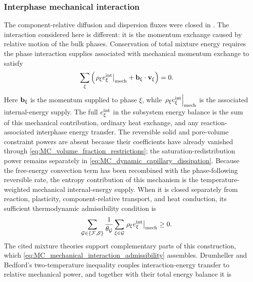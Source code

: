 \subsubsection{Interphase mechanical interaction}
\label{sec:MC_interphase_mechanical_interaction}

The component-relative diffusion and dispersion fluxes were closed in
.  The interaction considered here is
different: it is the momentum exchange caused by relative motion of the bulk
phases.  Conservation of total mixture energy requires the phase interaction
supplies associated with mechanical momentum exchange to satisfy
\cite{drumheller1980thermomechanical}
%
\begin{equation}
	\sum_\xi
	\left(
	\left.
	\rho_\xi e_\xi^{\rm int}
	\right\vert_{\rm mech}
	+\mathbf{b}_\xi\cdot\mathbf{v}_\xi
	\right)
	=0 .
	\label{eq:MC_interaction_energy_conservation}
\end{equation}
%
Here \(\mathbf{b}_\xi\) is the momentum supplied to phase \(\xi\), while
\(\left.\rho_\xi e_\xi^{\rm int}\right\vert_{\rm mech}\) is the associated
internal-energy supply.  The full \(e_\xi^{\rm int}\) in the subsystem energy
balance is the sum of this mechanical contribution, ordinary heat exchange, and
any reaction-associated interphase energy transfer.  The reversible solid and
pore-volume constraint powers are absent because their coefficients have
already vanished through \eqref{eq:MC_volume_fraction_restrictions}; the
saturation-redistribution power remains separately in
\eqref{eq:MC_dynamic_capillary_dissipation}.
Because the free-energy convection term has been recombined with the
phase-following reversible rate, the entropy contribution of this mechanism is
the temperature-weighted mechanical internal-energy supply.  When it is closed
separately from reaction, plasticity, component-relative transport, and heat
conduction, its sufficient thermodynamic admissibility condition is
%
\begin{equation}
	\sum_{\mathcal{G}\in\{\mathcal{F},\mathcal{S}\}}
	\frac{1}{\theta_{\mathcal{G}}}
	\sum_{\xi\in\mathcal{G}}
	\left.
	\rho_\xi e_\xi^{\rm int}
	\right\vert_{\rm mech}
	\ge0 .
	\label{eq:MC_mechanical_interaction_admissibility}
\end{equation}
%
The cited mixture theories support complementary parts of this construction,
which \eqref{eq:MC_mechanical_interaction_admissibility} assembles.  Drumheller
and Bedford's two-temperature inequality couples interaction-energy transfer to
relative mechanical power, and together with their total energy balance it is
